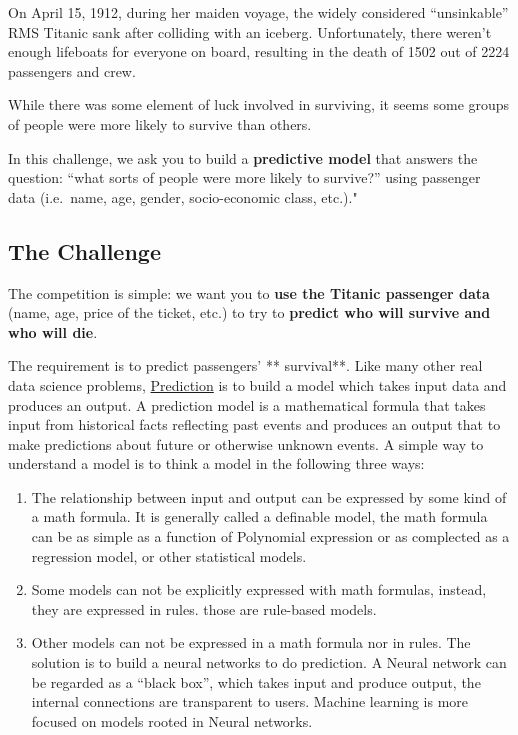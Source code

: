 \documentclass[
]{book}
\providecommand{\tightlist}{%
  \setlength{\itemsep}{0pt}\setlength{\parskip}{0pt}}
\begin{document}
On April 15, 1912, during her maiden voyage, the widely considered ``unsinkable'' RMS Titanic sank after colliding with an iceberg. Unfortunately, there weren't enough lifeboats for everyone on board, resulting in the death of 1502 out of 2224 passengers and crew.

While there was some element of luck involved in surviving, it seems some groups of people were more likely to survive than others.

In this challenge, we ask you to build a \textbf{predictive model} that answers the question: ``what sorts of people were more likely to survive?'' using passenger data (i.e.~name, age, gender, socio-economic class, etc.)."

\hypertarget{the-challenge}{%
\subsection*{The Challenge}\label{the-challenge}}


The competition is simple: we want you to \textbf{use the Titanic passenger data} (name, age, price of the ticket, etc.) to try to \textbf{predict who will survive and who will die}.

The requirement is to predict passengers' ** survival**. Like many other real data science problems, \protect\hyperlink{predictive}{Prediction} is to build a model which takes input data and produces an output. A prediction model is a mathematical formula that takes input from historical facts reflecting past events and produces an output that to make predictions about future or otherwise unknown events. A simple way to understand a model is to think a model in the following three ways:

\begin{enumerate}
\def\labelenumi{\arabic{enumi}.}
\tightlist
\item
  The relationship between input and output can be expressed by some kind of a math formula. It is generally called a definable model, the math formula can be as simple as a function of Polynomial expression or as complected as a regression model, or other statistical models.
\item
  Some models can not be explicitly expressed with math formulas, instead, they are expressed in rules. those are rule-based models.
\item
  Other models can not be expressed in a math formula nor in rules. The solution is to build a neural networks to do prediction. A Neural network can be regarded as a ``black box'', which takes input and produce output, the internal connections are transparent to users. Machine learning is more focused on models rooted in Neural networks.
\end{enumerate}
\end{document}
